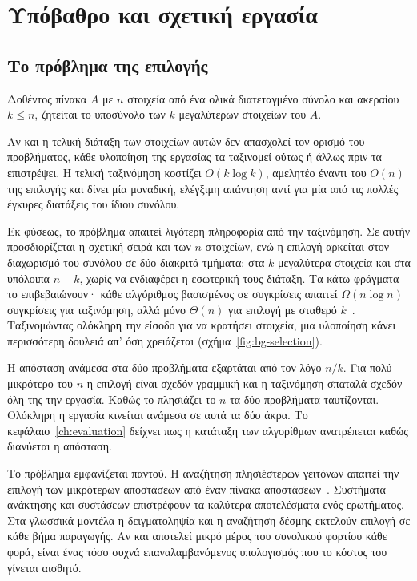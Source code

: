 \chapter{Υπόβαθρο και σχετική εργασία}
\label{ch:background}

\section{Το πρόβλημα της επιλογής }
\label{sec:bg-problem}

\begin{definition}
\label{def:topk}
Δοθέντος πίνακα $A$ με $n$ στοιχεία από ένα ολικά διατεταγμένο σύνολο και
ακεραίου $k \le n$, ζητείται το υποσύνολο των $k$ μεγαλύτερων στοιχείων του
$A$.
\end{definition}

Αν και η τελική διάταξη των στοιχείων αυτών δεν απασχολεί τον ορισμό του
προβλήματος, κάθε υλοποίηση της εργασίας τα ταξινομεί ούτως ή άλλως πριν τα
επιστρέψει. Η τελική ταξινόμηση κοστίζει $O(k \log k)$, αμελητέο έναντι του
$O(n)$ της επιλογής και δίνει μία μοναδική, ελέγξιμη απάντηση αντί για μία από
τις πολλές έγκυρες διατάξεις του ίδιου συνόλου.

Εκ φύσεως, το πρόβλημα απαιτεί λιγότερη πληροφορία από την ταξινόμηση. Σε αυτήν
προσδιορίζεται η σχετική σειρά και των $n$ στοιχείων, ενώ η επιλογή 
αρκείται στον διαχωρισμό του συνόλου σε δύο διακριτά τμήματα: στα $k$
μεγαλύτερα στοιχεία και στα υπόλοιπα $n-k$, χωρίς να ενδιαφέρει η εσωτερική
τους διάταξη. Τα κάτω φράγματα το επιβεβαιώνουν· κάθε αλγόριθμος βασισμένος σε
συγκρίσεις απαιτεί $\Omega(n \log n)$ συγκρίσεις για ταξινόμηση, αλλά μόνο
$\Theta(n)$ για επιλογή με σταθερό $k$~\cite{knuth1998}. Ταξινομώντας ολόκληρη
την είσοδο για να κρατήσει  στοιχεία, μια υλοποίηση κάνει περισσότερη
δουλειά απ' όση χρειάζεται (σχήμα~\ref{fig:bg-selection}).



Η απόσταση ανάμεσα στα δύο προβλήματα εξαρτάται από τον λόγο $n/k$. Για 
πολύ μικρότερο του $n$ η επιλογή είναι σχεδόν γραμμική και η ταξινόμηση σπαταλά
σχεδόν όλη της την εργασία. Καθώς το  πλησιάζει το $n$ τα δύο προβλήματα
ταυτίζονται. Ολόκληρη η εργασία κινείται ανάμεσα σε αυτά τα δύο άκρα. Το
κεφάλαιο~\ref{ch:evaluation} δείχνει πως η κατάταξη των αλγορίθμων ανατρέπεται
καθώς διανύεται η απόσταση.

Το πρόβλημα εμφανίζεται παντού. Η αναζήτηση  πλησιέστερων γειτόνων
απαιτεί την επιλογή των μικρότερων αποστάσεων από έναν πίνακα
αποστάσεων~\cite{sismanis2012}. Συστήματα ανάκτησης και συστάσεων επιστρέφουν
τα  καλύτερα αποτελέσματα ενός ερωτήματος. Στα γλωσσικά μοντέλα η
δειγματοληψία  και η αναζήτηση δέσμης εκτελούν επιλογή σε κάθε βήμα
παραγωγής. Αν και αποτελεί μικρό μέρος του συνολικού φορτίου κάθε φορά, είναι
ένας τόσο συχνά επαναλαμβανόμενος υπολογισμός που το κόστος του γίνεται
αισθητό.

